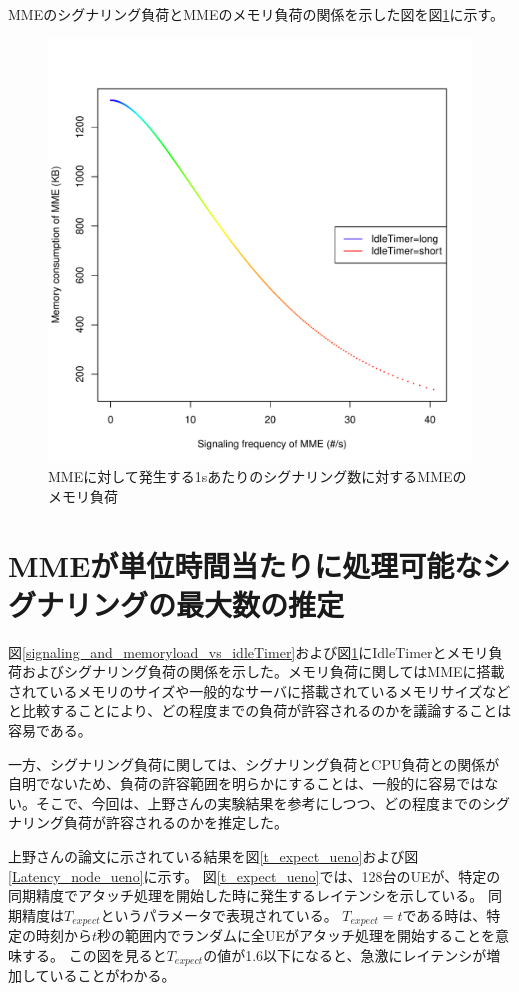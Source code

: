 \documentclass[a4j]{ujarticle}
\begin{document}
MMEのシグナリング負荷とMMEのメモリ負荷の関係を示した図を図\ref{signaling_vs_memoryload}に示す。
\begin{figure}[htbp]
  \centering
  \includegraphics[width=0.9\hsize]{signaling_vs_memoryload.pdf}
  \caption{MMEに対して発生する1sあたりのシグナリング数に対するMMEのメモリ負荷}
  \label{signaling_vs_memoryload}
\end{figure}

\clearpage


\section{MMEが単位時間当たりに処理可能なシグナリングの最大数の推定}
図\ref{signaling_and_memoryload_vs_idleTimer}および図\ref{signaling_vs_memoryload}にIdleTimerとメモリ負荷およびシグナリング負荷の関係を示した。メモリ負荷に関してはMMEに搭載されているメモリのサイズや一般的なサーバに搭載されているメモリサイズなどと比較することにより、どの程度までの負荷が許容されるのかを議論することは容易である。

一方、シグナリング負荷に関しては、シグナリング負荷とCPU負荷との関係が自明でないため、負荷の許容範囲を明らかにすることは、一般的に容易ではない。そこで、今回は、上野さんの実験結果を参考にしつつ、どの程度までのシグナリング負荷が許容されるのかを推定した。

上野さんの論文\cite{多数のM2M/IoT端末からの集中アクセスを考慮したモバイルコアネットワークの実験評価}に示されている結果を図\ref{t_expect_ueno}および図\ref{Latency_node_ueno}に示す。
図\ref{t_expect_ueno}では、128台のUEが、特定の同期精度でアタッチ処理を開始した時に発生するレイテンシを示している。
同期精度は$T_{expect}$というパラメータで表現されている。
$T_{expect} = t$である時は、特定の時刻から$t$秒の範囲内でランダムに全UEがアタッチ処理を開始することを意味する。
この図を見ると$T_{expect}$の値が1.6以下になると、急激にレイテンシが増加していることがわかる。
\end{document}
